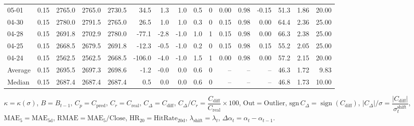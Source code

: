 \begin{threeparttable}
{\begin{tabular}{lrrrrrrrrrrrrrrr}
  05-01 &     0.15 & 2765.0 & 2765.0 & 2730.5 &       34.5 &            1.3 &                      1.0 &                 0.5 &              0 &       0.00 &      0.98 &          -0.15 &             51.3 &            1.86 &                  20.00 \\
  04-30 &     0.15 & 2780.0 & 2791.5 & 2765.0 &       26.5 &            1.0 &                      1.0 &                 0.3 &              0 &       0.15 &      0.98 &           0.00 &             64.4 &            2.36 &                  25.00 \\
  04-28 &     0.15 & 2691.8 & 2702.9 & 2780.0 &      -77.1 &           -2.8 &                     -1.0 &                 1.0 &              1 &       0.15 &      0.98 &           0.00 &             66.3 &            2.38 &                  25.00 \\
  04-25 &     0.15 & 2668.5 & 2679.5 & 2691.8 &      -12.3 &           -0.5 &                     -1.0 &                 0.2 &              0 &       0.15 &      0.98 &           0.15 &             55.2 &            2.05 &                  25.00 \\
  04-24 &     0.15 & 2562.5 & 2562.5 & 2668.5 &     -106.0 &           -4.0 &                     -1.0 &                 1.5 &              1 &       0.00 &      0.98 &           0.00 &             57.2 &            2.15 &                  20.00 \\
Average &     0.15 & 2695.5 & 2697.3 & 2698.6 &       -1.2 &           -0.0 &                      0.0 &                 0.6 &              0 &         -- &        -- &             -- &             46.3 &            1.72 &                   9.83 \\
 Median &     0.15 & 2687.4 & 2687.4 & 2687.4 &        0.5 &            0.0 &                      0.0 &                 0.6 &              0 &         -- &        -- &             -- &             46.8 &            1.73 &                  10.00 \\
\bottomrule
\end{tabular}
}
\begin{tablenotes}\footnotesize
\item $\kappa=\kappa(\sigma)$, $B=B_{t-1}$, $C_p=C_{\text{pred}}$, $C_r=C_{\text{real}}$, $C_\Delta=C_{\text{diff}}$, $C_\Delta/C_r=\dfrac{C_{\text{diff}}}{C_{\text{real}}}\times100$, $\mathrm{Out}=\text{Outlier}$, $\mathrm{sgn}\,C_\Delta=\operatorname{sign}(C_{\text{diff}})$, $|C_\Delta|/\sigma=\dfrac{|C_{\text{diff}}|}{\sigma_t^{\text{shift}}}$, $\mathrm{MAE}_5=\mathrm{MAE}_{5\text{d}}$, $\mathrm{RMAE}= \mathrm{MAE}_5 / \text{Close}$, $\mathrm{HR}_{20}=\mathrm{HitRate}_{20\text{d}}$, 
$\lambda_{\text{shift}}=\lambda_t$, 
$\Delta\alpha_t=\alpha_t-\alpha_{t-1}$.
\end{tablenotes}
\end{threeparttable}
\endgroup

